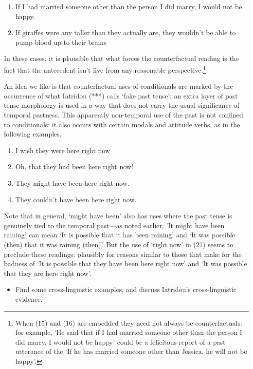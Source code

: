 \begin{enumerate}
\def\labelenumi{(\arabic{enumi})}
\setcounter{enumi}{17}
\item
  If I had married someone other than the person I did marry, I would
  not be happy.
\item
  If giraffes were any taller than they actually are, they wouldn't be
  able to pump blood up to their brains
\end{enumerate}

In these cases, it is plausible that what forces the counterfactual
reading is the fact that the antecedent isn't live from any reasonable
perspective.\footnote{When (15) and (16) are embedded they need not
  always be counterfactuals: for example, `He said that if I had married
  someone other than the person I did marry, I would not be happy' could
  be a felicitous report of a past utterance of the `If he has married
  someone other than Jessica, he will not be happy'.}

An idea we like is that counterfactual uses of conditionals are marked
by the occurrence of what Iatridou (***) calls `fake past tense': an
extra layer of past tense morphology is used in a way that does not
carry the usual significance of temporal pastness. This apparently
non-temporal use of the past is not confined to conditionals: it also
occurs with certain modals and attitude verbs, as in the following
examples.

\begin{enumerate}
\def\labelenumi{(\arabic{enumi})}
\setcounter{enumi}{19}
\item
  I wish they were here right now
\item
  Oh, that they had been here right now!
\item
  They might have been here right now.
\item
  They couldn't have been here right now.
\end{enumerate}

Note that in general, `might have been' also has uses where the past
tense is genuinely tied to the temporal past---as noted earlier, 'It
might have been raining' can mean `It is possible that it has been
raining' and `It was possible (then) that it was raining (then)'. But
the use of `right now' in (21) seems to preclude these readings:
plausibly for reasons similar to those that make for the badness of `It
is possible that they have been here right now' and `It was possible
that they are here right now'.

\begin{itemize}
\itemsep1pt\parskip0pt
\item
  Find some cross-linguistic examples, and discuss Iatridou's
  cross-linguistic evidence.
\end{itemize}

